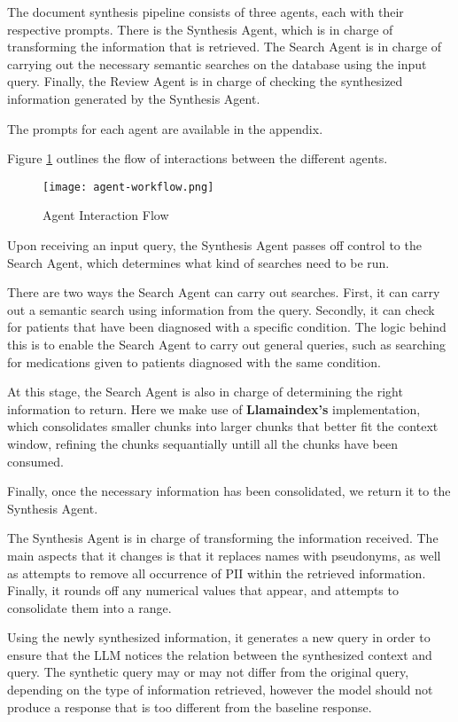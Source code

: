 The document synthesis pipeline consists of three agents, each with their respective prompts.
There is the Synthesis Agent, which is in charge of transforming the information that is retrieved. The Search Agent is in charge of carrying out the necessary semantic searches on the database using the input query. Finally, the Review Agent is in charge of checking the synthesized information generated by the Synthesis Agent.

The prompts for each agent are available in the appendix.

Figure \ref{fig:AgentInteraction} outlines the flow of interactions between the different agents.

\begin{figure}
	\centering
	\texttt{[image: agent-workflow.png]}
	\caption{Agent Interaction Flow}
	\label{fig:AgentInteraction}
\end{figure}

Upon receiving an input query, the Synthesis Agent passes off control to the Search Agent, which determines what kind of searches need to be run.

There are two ways the Search Agent can carry out searches. First, it can carry out a semantic search using information from the query. Secondly, it can check for patients that have been diagnosed with a specific condition. The logic behind this is to enable the Search Agent to carry out general queries, such as searching for medications given to patients diagnosed with the same condition.

At this stage, the Search Agent is also in charge of determining the right information to return. Here we make use of \textbf{Llamaindex's} implementation,  which consolidates smaller chunks into larger chunks that better fit the context window, refining the chunks sequantially untill all the chunks have been consumed.

Finally, once the necessary information has been consolidated, we return it to the Synthesis Agent.

The Synthesis Agent is in charge of transforming the information received. The main aspects that it changes is that it replaces names with pseudonyms, as well as attempts to remove all occurrence of PII within the retrieved information. Finally, it rounds off any numerical values that appear, and attempts to consolidate them into a range.

Using the newly synthesized information, it generates a new query in order to ensure that the LLM notices the relation between the synthesized context and query. The synthetic query may or may not differ from the original query, depending on the type of information retrieved, however the model should not produce a response that is too different from the baseline response.

